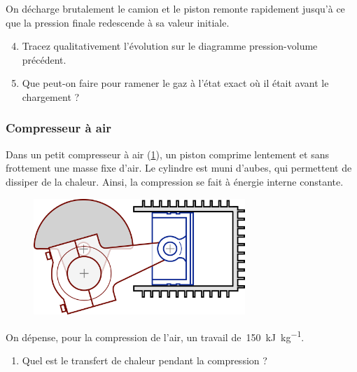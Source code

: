 	On décharge brutalement le camion et le piston remonte rapidement jusqu’à ce que la pression finale redescende à sa valeur initiale.
	
	\begin{enumerate}
		\setcounter{enumi}{3}
		\item Tracez qualitativement l’évolution sur le diagramme pression-volume précédent.
		\item Que peut-on faire pour ramener le gaz à l’état exact où il était avant le chargement ?
	\end{enumerate}


\subsubsection{Compresseur à air}
\label{exo_compresseur_air}

	Dans un petit compresseur à air (\cref{fig_compresseur}), un piston comprime lentement et sans frottement une masse fixe d’air. Le cylindre est muni d’aubes, qui permettent de dissiper de la chaleur. Ainsi, la compression se fait à énergie interne constante.	

	\begin{figure}
	\begin{center}
		\includegraphics[width=8cm]{images/compresseur_air.png}
	\end{center}
	\label{fig_compresseur}
	\end{figure}

	On dépense, pour la compression de l’air, un travail de~\SI{150}{\kilo\joule\per\kilogram}. 
		
	\begin{enumerate}
		\item Quel est le transfert de chaleur pendant la compression ?
	\end{enumerate}
	
